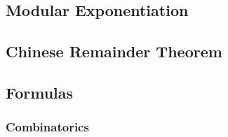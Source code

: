 \documentclass[10pt,a4paper,titlepage]{article}
\begin{document}
		\subsection{Modular Exponentiation}
			

		\subsection{Chinese Remainder Theorem}
			

		\subsection{Formulas}

			\subsubsection{Combinatorics}
\end{document}
